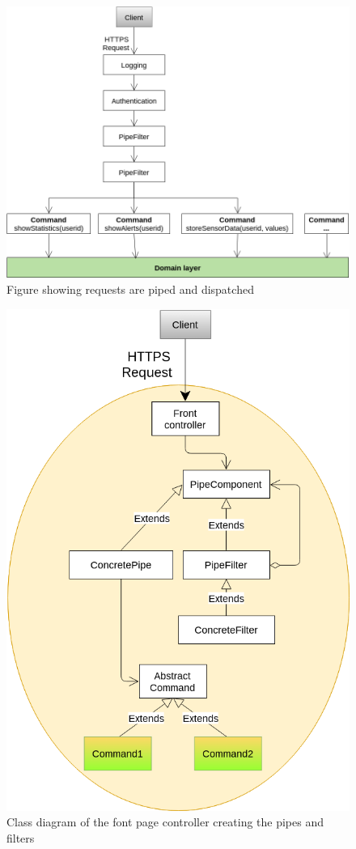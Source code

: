 \begin{figure}[H]
\centering
\includegraphics[width=0.8\linewidth]{7-software/images/FrontFlow.png}
\caption{Figure showing requests are piped and dispatched}
\label{fig:frontflow}
\end{figure}

\begin{figure}[H]
\centering
\includegraphics[width=0.8\linewidth]{7-software/images/FrontClasses.png}
\caption{Class diagram of the font page controller creating the pipes and filters}
\label{fig:frontclasses}
\end{figure}



